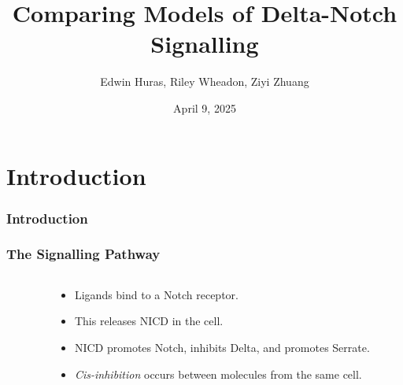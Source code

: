 \documentclass[aspectratio=169]{beamer}
\title{Comparing Models of Delta-Notch Signalling}
\author{Edwin Huras, Riley Wheadon, Ziyi Zhuang}
\institute{University of British Columbia}
\date{April 9, 2025}
\begin{document}
\begin{frame}
\titlepage
\end{frame}

\section{Introduction}

\begin{frame}
  \frametitle{Introduction}
\end{frame}

\begin{frame}
  \frametitle{The Signalling Pathway}

  \begin{columns}

    \begin{column}{0.48\textwidth}
      
    \end{column}
      
    \begin{column}{0.48\textwidth}
      \begin{itemize}
        \item Ligands bind to a Notch receptor.
        \item This releases NICD in the cell.
        \item NICD promotes Notch, inhibits Delta, and promotes Serrate.
        \item \emph{Cis-inhibition} occurs between molecules from the same cell.
      \end{itemize}
    \end{column}
      
  \end{columns}

\end{frame}
\end{document}
